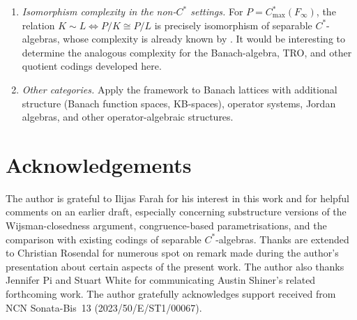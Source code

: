 \documentclass[12pt,fleqn,a4paper]{amsart}
\numberwithin{equation}{section}
\theoremstyle{definition}
\begin{document}
\begin{enumerate}
\item \emph{Isomorphism complexity in the non-$C^*$ settings.}
For $P=C^*_{\max}(F_\infty)$, the relation
$K\sim L \iff P/K\cong P/L$
is precisely isomorphism of separable $C^*$-algebras, whose complexity is
already known by \cite{FarahTomsTornquist,SabokCompleteness}.
It would be interesting to determine the analogous complexity for the
Banach-algebra, TRO, and other quotient codings developed here.

\item \emph{Other categories.}
Apply the framework to Banach lattices with additional structure
(Banach function spaces, KB-spaces), operator systems, Jordan algebras, and other
operator-algebraic structures.
\end{enumerate}

\section*{Acknowledgements}
The author is grateful to Ilijas Farah for his interest in this work and for
helpful comments on an earlier draft, especially concerning substructure versions
of the Wijsman-closedness argument, congruence-based parametrisations, and the
comparison with existing codings of separable $C^*$-algebras. Thanks are extended to Christian Rosendal for numerous spot on remark made during the author's presentation about certain aspects of the present work. The author also thanks Jennifer Pi and Stuart White for communicating Austin Shiner's related forthcoming work. The author gratefully acknowledges support received from
NCN Sonata-Bis~13 (2023/50/E/ST1/00067).
\end{document}

